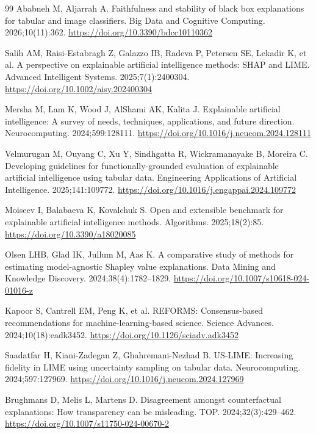 \documentclass[11pt,a4paper]{article}
\begin{document}
\begin{thebibliography}{99}
Ababneh M, Aljarrah A. Faithfulness and stability of black box explanations
for tabular and image classifiers. Big Data and Cognitive Computing.
2026;10(11):362. \url{https://doi.org/10.3390/bdcc10110362}

Salih AM, Raisi-Estabragh Z, Galazzo IB, Radeva P, Petersen SE, Lekadir K, et
al. A perspective on explainable artificial intelligence methods: SHAP and
LIME. Advanced Intelligent Systems. 2025;7(1):2400304.
\url{https://doi.org/10.1002/aisy.202400304}

Mersha M, Lam K, Wood J, AlShami AK, Kalita J. Explainable artificial
intelligence: A survey of needs, techniques, applications, and future
direction. Neurocomputing. 2024;599:128111.
\url{https://doi.org/10.1016/j.neucom.2024.128111}

Velmurugan M, Ouyang C, Xu Y, Sindhgatta R, Wickramanayake B, Moreira C.
Developing guidelines for functionally-grounded evaluation of explainable
artificial intelligence using tabular data. Engineering Applications of
Artificial Intelligence. 2025;141:109772.
\url{https://doi.org/10.1016/j.engappai.2024.109772}

Moiseev I, Balabaeva K, Kovalchuk S. Open and extensible benchmark for
explainable artificial intelligence methods. Algorithms. 2025;18(2):85.
\url{https://doi.org/10.3390/a18020085}

Olsen LHB, Glad IK, Jullum M, Aas K. A comparative study of methods for
estimating model-agnostic Shapley value explanations. Data Mining and
Knowledge Discovery. 2024;38(4):1782--1829.
\url{https://doi.org/10.1007/s10618-024-01016-z}

Kapoor S, Cantrell EM, Peng K, et al. REFORMS: Consensus-based
recommendations for machine-learning-based science. Science Advances.
2024;10(18):eadk3452.
\url{https://doi.org/10.1126/sciadv.adk3452}

Saadatfar H, Kiani-Zadegan Z, Ghahremani-Nezhad B. US-LIME: Increasing
fidelity in LIME using uncertainty sampling on tabular data. Neurocomputing.
2024;597:127969. \url{https://doi.org/10.1016/j.neucom.2024.127969}

Brughmans D, Melis L, Martens D. Disagreement amongst counterfactual
explanations: How transparency can be misleading. TOP. 2024;32(3):429--462.
\url{https://doi.org/10.1007/s11750-024-00670-2}


\end{thebibliography}
\end{document}
